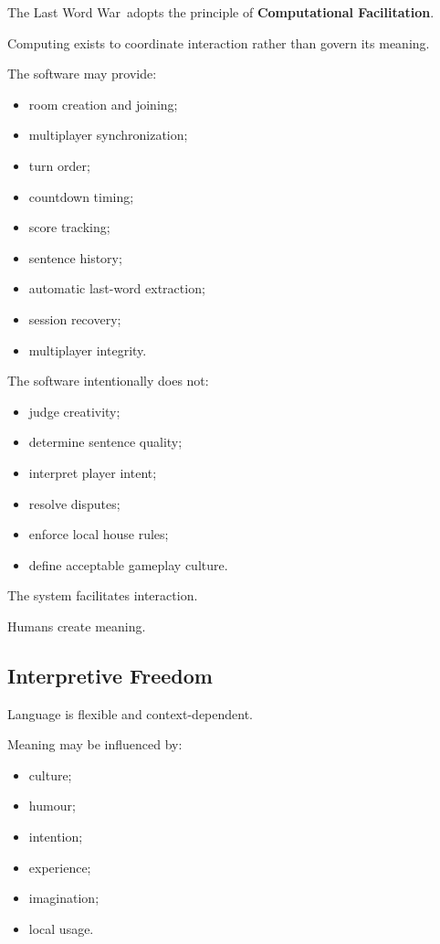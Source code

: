\documentclass[11pt,a4paper]{article}
\begin{document}
The Last Word War\texttrademark\ adopts the principle of \textbf{Computational Facilitation}.

Computing exists to coordinate interaction rather than govern its meaning.

The software may provide:

\begin{itemize}
    \item room creation and joining;
    \item multiplayer synchronization;
    \item turn order;
    \item countdown timing;
    \item score tracking;
    \item sentence history;
    \item automatic last-word extraction;
    \item session recovery;
    \item multiplayer integrity.
\end{itemize}

The software intentionally does not:

\begin{itemize}
    \item judge creativity;
    \item determine sentence quality;
    \item interpret player intent;
    \item resolve disputes;
    \item enforce local house rules;
    \item define acceptable gameplay culture.
\end{itemize}

The system facilitates interaction.

Humans create meaning.

\subsection{Interpretive Freedom}

Language is flexible and context-dependent.

Meaning may be influenced by:

\begin{itemize}
    \item culture;
    \item humour;
    \item intention;
    \item experience;
    \item imagination;
    \item local usage.
\end{itemize}
\end{document}
